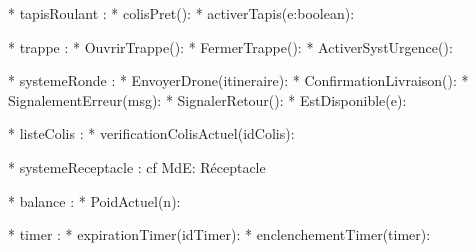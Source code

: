 
* tapisRoulant :
   * colisPret():
   * activerTapis(e:boolean):

* trappe :
   * OuvrirTrappe():
   * FermerTrappe():
   * ActiverSystUrgence():

* systemeRonde :
   * EnvoyerDrone(itineraire):
   * ConfirmationLivraison():
   * SignalementErreur(msg):
   * SignalerRetour():
   * EstDisponible(e):

* listeColis :
   * verificationColisActuel(idColis):

* systemeReceptacle : cf MdE: Réceptacle

* balance :
   * PoidActuel(n):

* timer :
   * expirationTimer(idTimer):
   * enclenchementTimer(timer):
